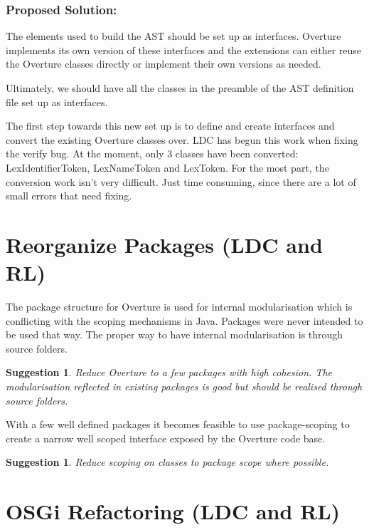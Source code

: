 \documentclass[11pt]{overturerep} \usepackage{t1enc,times,a4,t1enc}
\newtheorem{sug}[subsection]{Suggestion}
\begin{document}
\subsubsection{Proposed Solution:}

The elements used to build the AST should be set up as interfaces. Overture
implements its own version of these interfaces and the extensions can
either reuse the Overture classes directly or implement their own versions
as needed.

Ultimately, we should have all the classes in the preamble of the AST
definition file set up as interfaces.

The first step towards this new set up is to define and create interfaces
and convert the existing Overture classes over. LDC has begun this work
when fixing the verify bug. At the moment, only 3 classes have been
converted: \textsf{LexIdentifierToken}, \textsf{LexNameToken} and
\textsf{LexToken}. For the most part, the conversion work isn't very
difficult. Just time consuming, since there are a lot of small errors that
need fixing.





\section{Reorganize Packages (LDC and RL)} The package structure for
Overture is used for internal modularisation which is conflicting with the
scoping mechanisms in Java.  Packages were never intended to be used that
way. The proper way to have internal modularisation is through source
folders.

\begin{sug} 
    Reduce Overture to a few packages with high cohesion. The
    modularisation reflected in existing packages is good but should be realised
    through source folders.  
\end{sug}

With a few well defined packages it becomes feasible to use package-scoping to
create a narrow well scoped interface exposed by the Overture code base.

\begin{sug} 
    Reduce scoping on classes to package scope where possible.
\end{sug}





\section{OSGi Refactoring (LDC and RL)} \label{sec:osgi} 
\end{document}
